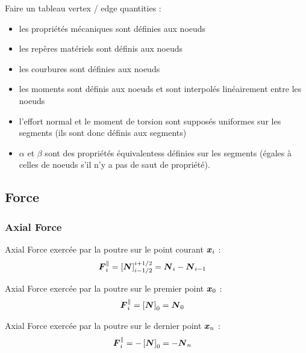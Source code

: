 Faire un tableau vertex / edge quantities :
\begin{itemize}
\item les propriétés mécaniques sont définies aux noeuds
\item les repères matériels sont définis aux noeuds
\item les courbures sont définies aux noeuds
\item les moments sont définis aux noeuds et sont interpolés linéairement entre les noeuds
\item l'effort normal et le moment de torsion sont supposés uniformes sur les segments (ils sont donc définis aux segments)
\item $\alpha$ et $\beta$ sont des propriétés équivalentess définies sur les segments (égales à celles de noeuds s'il n'y a pas de saut de propriété).
\end{itemize}

\subsection{Force}

\subsubsection{Axial Force}

Axial Force exercée par la poutre sur le point courant $\boldsymbol{x}_i$ :
\begin{equation}
	\begin{aligned}
	\boldsymbol{F}_i^{\parallel}
	&= \left[\boldsymbol{N}\right]_{i-1/2}^{i+1/2}
	= \boldsymbol{N}_{i} - \boldsymbol{N}_{i-1}
	\end{aligned}
\end{equation}

Axial Force exercée par la poutre sur le premier point $\boldsymbol{x}_0$ :
\begin{equation}
	\begin{aligned}
	\boldsymbol{F}_i^{\parallel}
	&= \left[\boldsymbol{N}\right]_{0}
	= \boldsymbol{N}_{0}
	\end{aligned}
\end{equation}

Axial Force exercée par la poutre sur le dernier point $\boldsymbol{x}_n$ :
\begin{equation}
	\begin{aligned}
	\boldsymbol{F}_i^{\parallel}
	&= -\left[\boldsymbol{N}\right]_{0}
	= -\boldsymbol{N}_{n}
	\end{aligned}
\end{equation}



